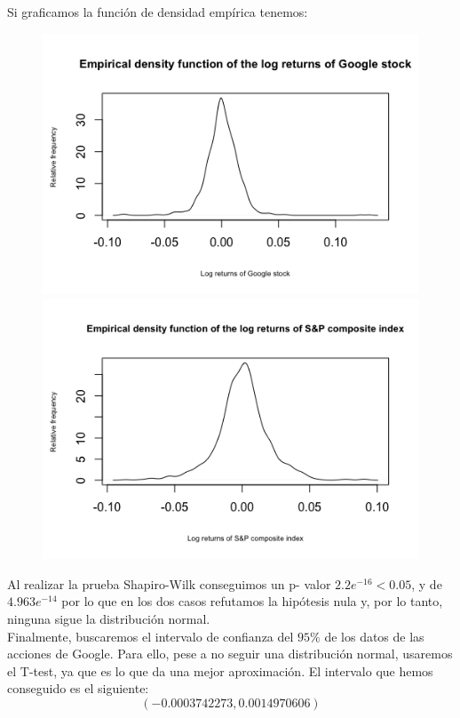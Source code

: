 \documentclass[a4paper,]{article}
\begin{document}
Si graficamos la función de densidad empírica tenemos: 
\begin{figure}[h!]
    \centering
    \includegraphics[scale=0.55]{Rplot2.png}
    \includegraphics[scale=0.55]{Rplot3.png}
\end{figure}

Al realizar la prueba Shapiro-Wilk conseguimos un p- valor $2.2e^{-16}<0.05$, y de $4.963e^{-14}$ por lo que en los dos casos refutamos la hipótesis nula y, por lo tanto, ninguna sigue la distribución normal. \\

Finalmente, buscaremos el intervalo de confianza del $95\%$ de los datos de las acciones de Google. Para ello, pese a no seguir una distribución normal, usaremos el T-test, ya que es lo que da una mejor aproximación. 
El intervalo que hemos conseguido es el siguiente: $$(-0.0003742273, 0.0014970606)$$
\end{document}
